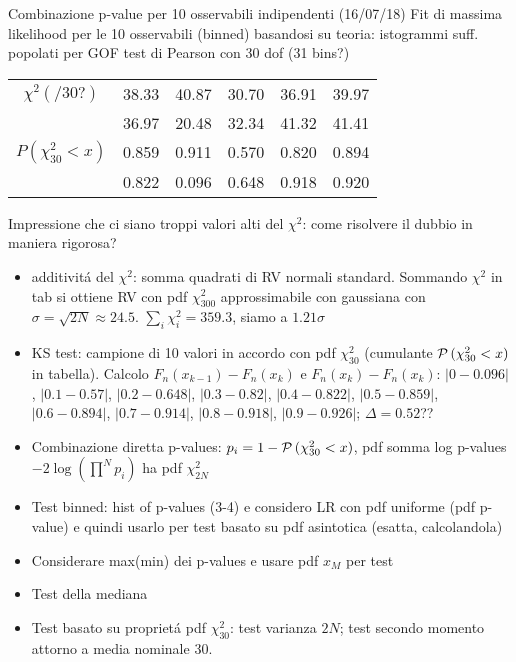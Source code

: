 \begin{wordonframe}{Combinazione p-value per 10 osservabili indipendenti (16/07/18)}
	Fit di massima likelihood per le 10 osservabili (binned) basandosi su teoria: istogrammi suff. popolati per GOF test di Pearson con 30 dof (31 bins?)
	\begin{table}[h!]
		\centering
		\begin{tabular}{||cccccc||} 
			$\chi^2(/30?)$&38.33&40.87&30.70&36.91&39.97\\
			&36.97&20.48&32.34&41.32&41.41\\
			$P(\chi^2_{30}<x)$&0.859&0.911&0.570&0.820&0.894\\
			&0.822&0.096&0.648&0.918&0.920\\
		\end{tabular}
	\end{table}
	Impressione che ci siano troppi valori alti del $\chi^2$: come risolvere il dubbio in maniera rigorosa?
	\begin{itemize}
	\item additivit\'a del $\chi^2$: somma quadrati di RV normali standard.
			Sommando $\chi^2$ in tab si ottiene RV con pdf $\chi^2_{300}$ approssimabile con gaussiana con $\sigma=\sqrt{2N}\approx24.5$.
			$\sum_i\chi^2_i=359.3$, siamo a $1.21\sigma$
	\item KS test: campione di 10 valori in accordo con pdf $\chi^2_{30}$ (cumulante $\operatorname{\mathcal{P}}{(\chi^2_{30}<x)}$ in tabella). Calcolo $F_n(x_{k-1})-F_n(x_k)$ e $F_n(x_k)-F_n(x_k)$:  $|0-0.096|$, $|0.1-0.57|$, $|0.2-0.648|$, $|0.3-0.82|$, $|0.4-0.822|$, $|0.5-0.859|$, $|0.6-0.894|$, $|0.7-0.914|$, $|0.8-0.918|$, $|0.9-0.926|$; $\Delta=0.52$??
	\item Combinazione diretta p-values: $p_i=1-\operatorname{\mathcal{P}}{(\chi^2_{30}<x)}$, pdf somma log p-values $-2\log{(\prod^Np_i)}$ ha pdf $\chi^2_{2N}$
	\item Test binned: hist of p-values (3-4) e considero LR con pdf uniforme (pdf p-value) e quindi usarlo per test basato su pdf asintotica (esatta, calcolandola)
	\item Considerare max(min) dei p-values e usare pdf $x_M$ per test
	\item Test della mediana
	\item Test basato su propriet\'a pdf $\chi^2_{30}$: test varianza $2N$; test secondo momento attorno a media nominale 30.
\end{itemize}
\end{wordonframe}


